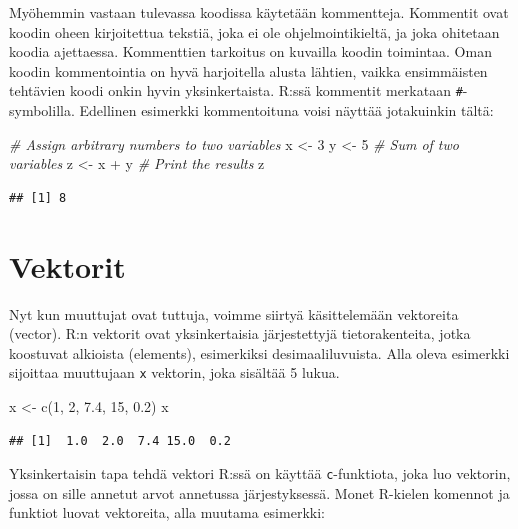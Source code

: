 \documentclass[
]{book}
\newenvironment{Shaded}{\begin{snugshade}}{\end{snugshade}}
\newcommand{\CommentTok}[1]{\textcolor[rgb]{0.56,0.35,0.01}{\textit{#1}}}
\newcommand{\DecValTok}[1]{\textcolor[rgb]{0.00,0.00,0.81}{#1}}
\newcommand{\FloatTok}[1]{\textcolor[rgb]{0.00,0.00,0.81}{#1}}
\newcommand{\FunctionTok}[1]{\textcolor[rgb]{0.00,0.00,0.00}{#1}}
\newcommand{\NormalTok}[1]{#1}
\newcommand{\OtherTok}[1]{\textcolor[rgb]{0.56,0.35,0.01}{#1}}
\newcommand{\SpecialCharTok}[1]{\textcolor[rgb]{0.00,0.00,0.00}{#1}}
\begin{document}
Myöhemmin vastaan tulevassa koodissa käytetään kommentteja. Kommentit ovat koodin oheen kirjoitettua tekstiä, joka ei ole ohjelmointikieltä, ja joka ohitetaan koodia ajettaessa. Kommenttien tarkoitus on kuvailla koodin toimintaa. Oman koodin kommentointia on hyvä harjoitella alusta lähtien, vaikka ensimmäisten tehtävien koodi onkin hyvin yksinkertaista. R:ssä kommentit merkataan \texttt{\#}-symbolilla. Edellinen esimerkki kommentoituna voisi näyttää jotakuinkin tältä:

\begin{Shaded}
\begin{Highlighting}[]
\CommentTok{\# Assign arbitrary numbers to two variables}
\NormalTok{x }\OtherTok{\textless{}{-}} \DecValTok{3}
\NormalTok{y }\OtherTok{\textless{}{-}} \DecValTok{5}
\CommentTok{\# Sum of two variables}
\NormalTok{z }\OtherTok{\textless{}{-}}\NormalTok{ x }\SpecialCharTok{+}\NormalTok{ y}
\CommentTok{\# Print the results}
\NormalTok{z}
\end{Highlighting}
\end{Shaded}

\begin{verbatim}
## [1] 8
\end{verbatim}

\hypertarget{vectors}{%
\section{Vektorit}\label{vectors}}

Nyt kun muuttujat ovat tuttuja, voimme siirtyä käsittelemään vektoreita (vector). R:n vektorit ovat yksinkertaisia järjestettyjä tietorakenteita, jotka koostuvat alkioista (elements), esimerkiksi desimaaliluvuista. Alla oleva esimerkki sijoittaa muuttujaan \texttt{x} vektorin, joka sisältää 5 lukua.

\begin{Shaded}
\begin{Highlighting}[]
\NormalTok{x }\OtherTok{\textless{}{-}} \FunctionTok{c}\NormalTok{(}\DecValTok{1}\NormalTok{, }\DecValTok{2}\NormalTok{, }\FloatTok{7.4}\NormalTok{, }\DecValTok{15}\NormalTok{, }\FloatTok{0.2}\NormalTok{)}
\NormalTok{x}
\end{Highlighting}
\end{Shaded}

\begin{verbatim}
## [1]  1.0  2.0  7.4 15.0  0.2
\end{verbatim}

Yksinkertaisin tapa tehdä vektori R:ssä on käyttää \texttt{c}-funktiota, joka luo vektorin, jossa on sille annetut arvot annetussa järjestyksessä. Monet R-kielen komennot ja funktiot luovat vektoreita, alla muutama esimerkki:
\end{document}
